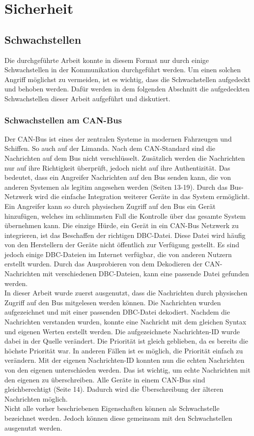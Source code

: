 \chapter{Sicherheit}

\section{Schwachstellen}
Die durchgeführte Arbeit konnte in diesem Format nur durch einige Schwachstellen in der Kommunikation durchgeführt werden.
Um einen solchen Angriff möglichst zu vermeiden, ist es wichtig, dass die Schwachstellen aufgedeckt und behoben werden.
Dafür werden in dem folgenden Abschnitt die aufgedeckten Schwachstellen dieser Arbeit aufgeführt und diskutiert.

\subsection{Schwachstellen am CAN-Bus}
Der CAN-Bus ist eines der zentralen Systeme in modernen Fahrzeugen und Schiffen. So auch auf der Limanda.
Nach dem CAN-Standard sind die Nachrichten auf dem Bus nicht verschlüsselt. Zusätzlich werden die Nachrichten nur 
auf ihre Richtigkeit überprüft, jedoch nicht auf ihre Authentizität. Das bedeutet, dass ein Angreifer Nachrichten auf den Bus
senden kann, die von anderen Systemen als legitim angesehen werden \cite{Voss2008} (Seiten 13-19). Durch das Bus-Netzwerk wird die einfache Integration
weiterer
Geräte in das System ermöglicht. Ein Angreifer kann so durch physischen Zugriff auf den Bus ein Gerät hinzufügen, welches im schlimmsten Fall
die Kontrolle über das gesamte System übernehmen kann. Die einzige Hürde, ein Gerät in ein CAN-Bus Netzwerk zu integrieren, ist das
Beschaffen der richtigen DBC-Datei. Diese Datei wird häufig von den Herstellern der Geräte nicht öffentlich zur Verfügung gestellt.
Es sind jedoch einige DBC-Dateien im Internet verfügbar, die von anderen Nutzern erstellt wurden. Durch das Ausprobieren von dem Dekodieren
der CAN-Nachrichten mit verschiedenen DBC-Dateien, kann eine passende Datei gefunden werden. \\
In dieser Arbeit wurde zuerst ausgenutzt, dass die Nachrichten durch physischen Zugriff auf den Bus mitgelesen werden können.
Die Nachrichten wurden aufgezeichnet und mit einer passenden DBC-Datei dekodiert. Nachdem die Nachrichten verstanden wurden, konnte
eine Nachricht mit dem gleichen Syntax und eigenen Werten erstellt werden. Die aufgezeichnete Nachrichten-ID wurde dabei in der Quelle 
verändert. Die Priorität ist gleich geblieben, da es bereits die höchste Priorität war. In anderen Fällen ist es möglich, die Priorität
einfach zu verändern. Mit der eigenen Nachrichten-ID konnten nun die 
echten Nachrichten von den eigenen unterschieden werden. Das ist wichtig, um echte Nachrichten mit den eigenen zu überschreiben. 
Alle Geräte in einem CAN-Bus sind gleichberechtigt\cite{Voss2008} (Seite 14). Dadurch wird die Überschreibung der älteren Nachrichten möglich.\\
Nicht alle vorher beschriebenen Eigenschaften können als Schwachstelle bezeichnet werden. Jedoch können diese gemeinsam mit den
Schwachstellen ausgenutzt werden. \\

